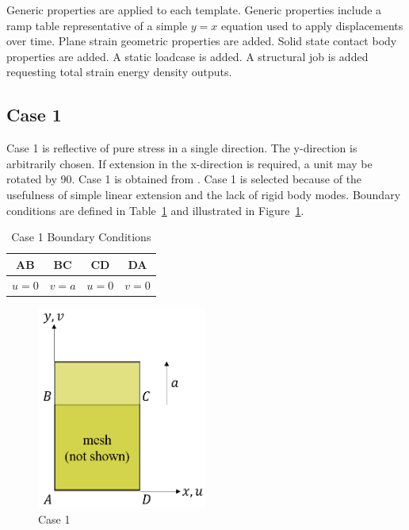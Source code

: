 Generic properties are applied to each template. Generic properties include a ramp table representative of a simple $y=x$ equation used to apply displacements over time. Plane strain geometric properties are added. Solid state contact body properties are added. A static loadcase is added. A structural job is added requesting total strain energy density outputs.

\subsection{Case 1}

Case 1 is reflective of pure stress in a single direction. The y-direction is arbitrarily chosen. If extension in the x-direction is required, a unit may be rotated by 90\textdegree . Case 1 is obtained from \cite{Cook2002}. Case 1 is selected because of the usefulness of simple linear extension and the lack of rigid body modes. Boundary conditions are defined in Table~\ref{tab:c1bc} and illustrated in Figure~\ref{fig:c1}.

\begin{table}[H]
\centering
\caption{Case 1 Boundary Conditions \cite{Cook2002}}
\label{tab:c1bc}
\begin{tabular}{lccc}
\hline
\multicolumn{1}{c}{\textbf{AB}} & \textbf{BC}               & \textbf{CD}               & \textbf{DA}               \\ \hline
$u=0$                           & \multicolumn{1}{r}{$v=a$} & \multicolumn{1}{r}{$u=0$} & \multicolumn{1}{r}{$v=0$} \\ \hline
\end{tabular}
\end{table}

\begin{figure}[H]
	\centering
	\includegraphics[width=0.5\textwidth]{case1.png}
	\caption{Case 1}
	\label{fig:c1}
\end{figure}

